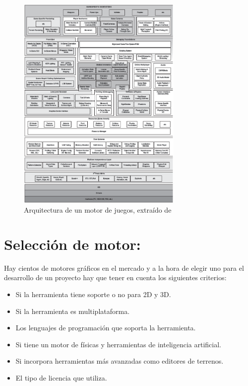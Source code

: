\begin{figure}[h!]

	\centering
	\includegraphics[width=8cm]{./eps/fig3.eps}
	\caption{Arquitectura de un motor de juegos, extraído de \cite{B10}}
	\label{Figura3}

\end{figure}
\newpage

\section{Selección de motor:}
Hay cientos de motores gráficos en el mercado y a la hora de elegir uno para el desarrollo de un proyecto hay que tener en cuenta los siguientes criterios\cite{B9}:

\begin{itemize}

	\item Si la herramienta tiene soporte o no para 2D y 3D.
	\item Si la herramienta es multiplataforma.
	\item Los lenguajes de programación que soporta la herramienta.
	\item Si tiene un motor de físicas y herramientas de inteligencia artificial.
	\item Si incorpora herramientas más avanzadas como editores de terrenos.
	\item El tipo de licencia que utiliza. 

\end{itemize}

